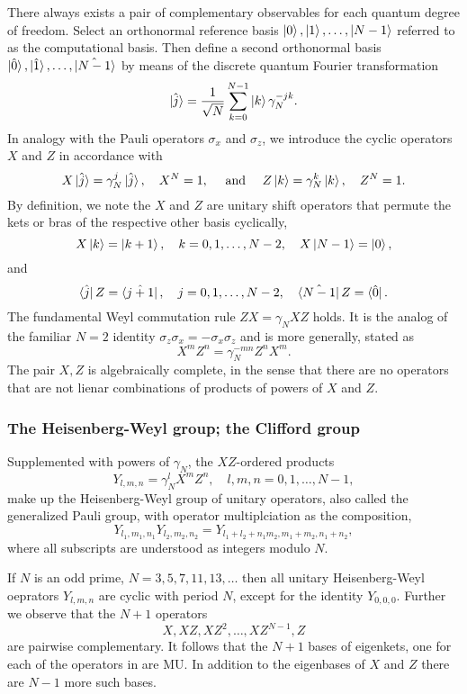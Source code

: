 \documentclass[a4paper]{article}
\begin{document}
  There always exists a pair of complementary observables
  for each quantum degree of freedom. Select an orthonormal
  reference basis $\ket 0, \ket 1,\ldots,\ket{N-1}$ 
  referred to as the computational basis. Then define a
  second orthonormal basis
  $\ket{\hat{0}},\ket{\hat{1}},\ldots,\ket{\hat{N-1}}$ by
  means of the discrete quantum Fourier transformation
  \[
    \ket{\hat{j}}
    = \frac{1}{\sqrt{N}} \sum_{k=0}^{N-1} \ket k
    \gamma_N^{-jk}.
  \] 
  In analogy with the Pauli operators $\sigma_x$ and
  $\sigma_z$, we introduce the cyclic operators $X$ and $Z$ 
  in accordance with
  \[
    X\ket{\hat{j}} = \gamma_N^{j} \ket{\hat{j}},
    \quad X^{N} = 1,
    \quad \text{ and } \quad
    Z\ket{k} = \gamma_N^{k} \ket k,
    \quad Z^{N} = 1.
  \] 
  By definition, we note the $X$ and $Z$ are unitary shift
  operators that permute the kets or bras of the respective
  other basis cyclically,
  \[
    X \ket k = \ket{k+1},
    \quad k = 0,1,\ldots,N-2,
    \quad X \ket{N-1} = \ket 0,
  \] 
  and
  \[
    \bra{\hat{j}} Z = \bra{\hat{j+1}}, 
    \quad j = 0,1,\ldots,N-2,
    \quad \bra{\hat{N-1}} Z = \bra{\hat{0}}.
  \] 
  The fundamental Weyl commutation rule $ZX = \gamma_N XZ$ 
  holds. It is the analog of the familiar $N = 2$ identity
  $\sigma_z \sigma_x = -\sigma_x \sigma_z$ and is more
  generally, stated as
  \[
    X^{m}Z^{n} = \gamma_N^{-mn} Z^{n}X^{m}.
  \] 
  The pair $X,Z$ is algebraically complete, in the sense
  that there are no operators that are not lienar
  combinations of products of powers of $X$ and $Z$.

  \subsubsection{The Heisenberg-Weyl group; the Clifford
  group}

  Supplemented with powers of $\gamma_N$, the $XZ$-ordered
  products 
  \[
    Y_{l,m,n} = \gamma_N^{l} X^{m}Z^{n},
    \quad l,m,n = 0,1,\ldots,N-1,
  \] 
  make up the Heisenberg-Weyl group of unitary operators,
  also called the generalized Pauli group, with operator
  multiplciation as the composition,
  \[
    Y_{l_1,m_1,n_1} Y_{l_2,m_2,n_2}
    = Y_{l_1+l_2+n_1m_2,m_1+m_2,n_1+n_2},
  \] 
  where all subscripts are understood as integers modulo
  $N$.

  If $N$ is an odd prime, $N = 3,5,7,11,13,\ldots$ then all
  unitary Heisenberg-Weyl oeprators $Y_{l,m,n}$ are cyclic
  with period $N$, except for the identity $Y_{0,0,0}$.
  Further we observe that the $N+1$ operators
  \[
    X,XZ,XZ^2,\ldots,XZ^{N-1},Z
  \] 
  are pairwise complementary. It follows that the $N+1$ 
  bases of eigenkets, one for each of the operators in are
  MU. In addition to the eigenbases of $X$ and $Z$ there are
  $N-1$ more such bases.
\end{document}
